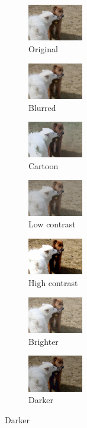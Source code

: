 \begin{figure}[ht]
	\centering
	\captionsetup[subfigure]{labelformat=empty}
		\begin{subfigure}[b]{0.1\textwidth}
		\centering
		\includegraphics[width=2.4cm]{orig - filter.jpeg}
		\caption{Original}
		\end{subfigure}
		\hfill
		\begin{subfigure}[b]{0.1\textwidth}
			\includegraphics[width=2.4cm]{orig - filter - blur.jpeg}
			\caption{Blurred}
		\end{subfigure}
		\hfill
		\begin{subfigure}[b]{0.1\textwidth}
			\includegraphics[width=2.4cm]{orig - filter - cartoon.jpeg}
			\caption{Cartoon}
		\end{subfigure}
		\hfill
		\begin{subfigure}[b]{0.1\textwidth}
			\includegraphics[width=2.4cm]{orig - filter - man contr (2).jpg}
			\caption{Low contrast}
		\end{subfigure}
		\hfill
		\begin{subfigure}[b]{0.1\textwidth}
			\includegraphics[width=2.4cm]{orig - filter - man contr (1).jpg}
			\caption{High contrast}
		\end{subfigure}
		\hfill
		\begin{subfigure}[b]{0.1\textwidth}
			\includegraphics[width=2.4cm]{orig - filter - lumin (1).jpeg}
			\caption{Brighter}
		\end{subfigure}
		\hfill
		\begin{subfigure}[b]{0.1\textwidth}
			\includegraphics[width=2.4cm]{orig - filter - lumin (2).jpeg}
			\caption{Darker}
		\end{subfigure}
	

\end{figure}
